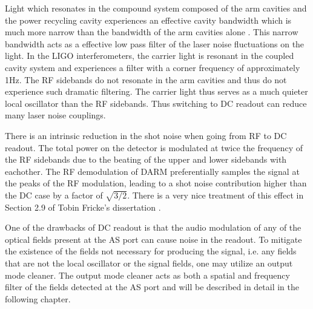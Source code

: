 Light which resonates in the compound system composed of the arm cavities and the power recycling cavity experiences an effective cavity bandwidth which is much more narrow than the bandwidth of the arm cavities alone \cite{Rakhmanov}. %
This narrow bandwidth acts as a effective low pass filter of the laser noise fluctuations on the light. %
In the LIGO interferometers, the carrier light is resonant in the coupled cavity system and experiences a filter with a corner frequency of approximately 1Hz. %
The RF sidebands do not resonate in the arm cavities and thus do not experience such dramatic filtering. %
The carrier light thus serves as a much quieter local oscillator than the RF sidebands. %
Thus switching to DC readout can reduce many laser noise couplings.

There is an intrinsic reduction in the shot noise when going from RF to DC readout. %
The total power on the detector is modulated at twice the frequency of the RF sidebands due to the beating of the upper and lower sidebands with eachother. %
The RF demodulation of DARM preferentially samples the signal at the peaks of the RF modulation, leading to a shot noise contribution higher than the DC case by a factor of $\sqrt{3/2}$. %
There is a very nice treatment of this effect in Section 2.9 of Tobin Fricke's dissertation \cite{FrickeThesis}.

One of the drawbacks of DC readout is that the audio modulation of any of the optical fields present at the AS port can cause noise in the readout. %
To mitigate the existence of the fields not necessary for producing the signal, i.e. %
any fields that are not the local oscillator or the signal fields, one may utilize an output mode cleaner. %
The output mode cleaner acts as both a spatial and frequency filter of the fields detected at the AS port and will be described in detail in the following chapter.
